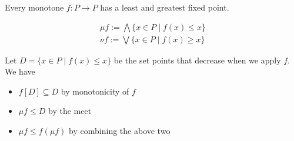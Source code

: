 \begin{theorem}
  Every monotone $f : P \to P$ has a least and greatest fixed point.
\end{theorem}

\begin{align*}
  \mu f := \bigwedge \{ x \in P \mid f(x) \leq x \}\\
  \nu f := \bigvee \{ x \in P \mid f(x) \geq x \}
\end{align*}

Let $D = \{ x \in P \mid f(x) \leq x \}$ be the set points that decrease when we apply $f$.
We have
\begin{itemize}
  \item $f[D] \subseteq D$ by monotonicity of $f$
  \item $\mu f \leq D$ by the meet
  \item $\mu f \leq f(\mu f)$ by combining the above two
\end{itemize}
